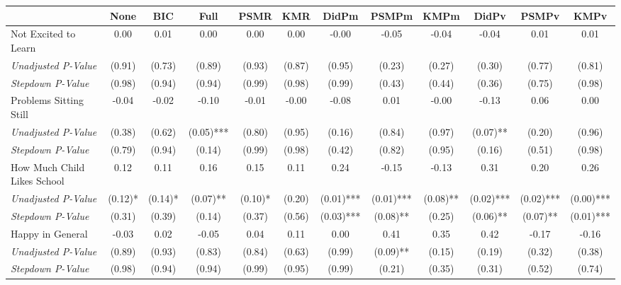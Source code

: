 \begin{tabular}{l c c c c c c c c c c c}
\toprule
 & None & BIC & Full & PSMR & KMR & DidPm & PSMPm & KMPm & DidPv & PSMPv & KMPv \\
\midrule
Not Excited to Learn & 0.00 & 0.01 & 0.00 & 0.00 & 0.00 & -0.00 & -0.05 & -0.04 & -0.04 & 0.01 & 0.01 \\
\quad \textit{Unadjusted P-Value} & (0.91) & (0.73) & (0.89) & (0.93) & (0.87) & (0.95) & (0.23) & (0.27) & (0.30) & (0.77) & (0.81) \\
\quad \textit{Stepdown P-Value} & (0.98) & (0.94) & (0.94) & (0.99) & (0.98) & (0.99) & (0.43) & (0.44) & (0.36) & (0.75) & (0.98) \\
Problems Sitting Still & -0.04 & -0.02 & -0.10 & -0.01 & -0.00 & -0.08 & 0.01 & -0.00 & -0.13 & 0.06 & 0.00 \\
\quad \textit{Unadjusted P-Value} & (0.38) & (0.62) & (0.05)*** & (0.80) & (0.95) & (0.16) & (0.84) & (0.97) & (0.07)** & (0.20) & (0.96) \\
\quad \textit{Stepdown P-Value} & (0.79) & (0.94) & (0.14) & (0.99) & (0.98) & (0.42) & (0.82) & (0.95) & (0.16) & (0.51) & (0.98) \\
How Much Child Likes School & 0.12 & 0.11 & 0.16 & 0.15 & 0.11 & 0.24 & -0.15 & -0.13 & 0.31 & 0.20 & 0.26 \\
\quad \textit{Unadjusted P-Value} & (0.12)* & (0.14)* & (0.07)** & (0.10)* & (0.20) & (0.01)*** & (0.01)*** & (0.08)** & (0.02)*** & (0.02)*** & (0.00)*** \\
\quad \textit{Stepdown P-Value} & (0.31) & (0.39) & (0.14) & (0.37) & (0.56) & (0.03)*** & (0.08)** & (0.25) & (0.06)** & (0.07)** & (0.01)*** \\
Happy in General & -0.03 & 0.02 & -0.05 & 0.04 & 0.11 & 0.00 & 0.41 & 0.35 & 0.42 & -0.17 & -0.16 \\
\quad \textit{Unadjusted P-Value} & (0.89) & (0.93) & (0.83) & (0.84) & (0.63) & (0.99) & (0.09)** & (0.15) & (0.19) & (0.32) & (0.38) \\
\quad \textit{Stepdown P-Value} & (0.98) & (0.94) & (0.94) & (0.99) & (0.95) & (0.99) & (0.21) & (0.35) & (0.31) & (0.52) & (0.74) \\
\bottomrule
\end{tabular}
